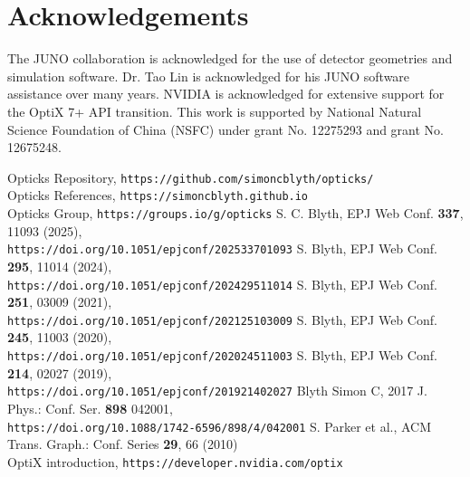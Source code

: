\documentclass{webofc}
\begin{document}
\section*{Acknowledgements}
%
The JUNO collaboration is acknowledged for the use of detector 
geometries and simulation software. Dr. Tao Lin is acknowledged 
for his JUNO software assistance over many years. NVIDIA is acknowledged for extensive 
support for the OptiX 7+ API transition.
%
This work is supported by National Natural Science Foundation of China (NSFC)
under grant No. 12275293 and grant No. 12675248.
%
\begin{thebibliography}{}
%
Opticks Repository, \texttt{https://github.com/simoncblyth/opticks/}\\
Opticks References, \texttt{https://simoncblyth.github.io}\\
Opticks Group, \texttt{https://groups.io/g/opticks}
%
S. C. Blyth, 
EPJ Web Conf. {\bf 337}, 11093 (2025),\\
\texttt{https://doi.org/10.1051/epjconf/202533701093}
S. Blyth,
EPJ Web Conf. {\bf 295}, 11014 (2024),\\
\texttt{https://doi.org/10.1051/epjconf/202429511014}
S. Blyth,
EPJ Web Conf. {\bf 251}, 03009 (2021),\\
\texttt{https://doi.org/10.1051/epjconf/202125103009}
S. Blyth,
EPJ Web Conf. {\bf 245}, 11003 (2020),\\
\texttt{https://doi.org/10.1051/epjconf/202024511003}
S. Blyth,
EPJ Web Conf. {\bf 214}, 02027 (2019),\\
\texttt{https://doi.org/10.1051/epjconf/201921402027}
Blyth Simon C,
2017 J. Phys.: Conf. Ser. {\bf 898} 042001,\\
\texttt{https://doi.org/10.1088/1742-6596/898/4/042001}
%
S. Parker et al., ACM Trans. Graph.: Conf. Series {\bf 29}, 66 (2010)\\
\hspace*{0.0em}OptiX introduction, \texttt{https://developer.nvidia.com/optix}\\

\end{thebibliography}
\end{document}
